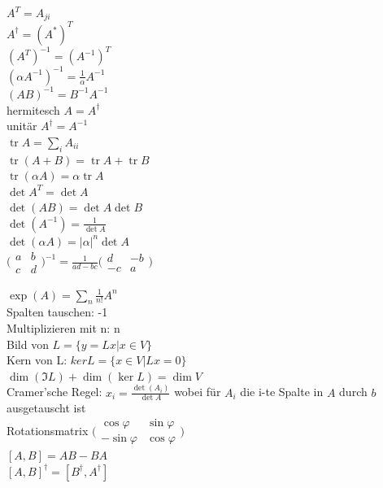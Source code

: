 \documentclass[12pt,a4paper, twoside]{article}
\DeclareMathOperator{\tr}{tr}
\newcommand{\abs}[1]{\left| #1 \right|}
\renewcommand{\=}[1]{\stackrel{#1}{=}}
\theoremstyle{definition}
\theoremstyle{remark}
\begin{document}
\begin{center}
\begin{minipage}[t]{.49\linewidth}
\vspace{0pt}
$A^T = A_{ji}$\\
$A^{\dagger} = (A^*)^T$\\
$(A^T)^{-1} = (A^{-1})^T$\\
$(\alpha A^{-1})^{-1} = \frac{1}{\alpha} A^{-1}$\\
$(AB)^{-1} = B^{-1} A^{-1}$\\
hermitesch $A = A^{\dagger}$\\
unitär $A^{\dagger} = A^{-1}$\\
$\tr A = \sum_i A_{ii}$\\
$\tr (A+B) = \tr A + \tr B$\\
$\tr (\alpha A) = \alpha \tr A$\\
$\det A^T = \det A$\\
$\det (AB) = \det A \det B$\\
$\det (A^{-1}) = \frac{1}{\det A}$\\
$\det (\alpha A) = \abs{\alpha}^n \det A$\\
$\bigl(\begin{smallmatrix} a & b\\
c & d \end{smallmatrix}\bigr)^{-1} = \frac{1}{ad-bc} \bigl(\begin{smallmatrix} d & -b\\
-c & a \end{smallmatrix}\bigr)$\\


\end{minipage}%
\begin{minipage}[t]{.49\linewidth}
\vspace{0pt}

$\exp (A) = \sum_n \frac{1}{n!} A^n$\\
Spalten tauschen: -1\\
Multiplizieren mit n: n\\
Bild von $L = \{y = Lx | x \in V\}$\\
Kern von L: $ker L = \{x \in V | L x = 0\}$\\
$\dim(\Im L) + \dim(\ker L) = \dim V$\\
Cramer'sche Regel: $x_i = \frac{\det (A_i)}{\det A}$ wobei für $A_i$ die i-te Spalte in $A$ durch $b$ ausgetauscht ist\\
Rotationsmatrix $\bigl(\begin{smallmatrix} \cos \varphi & \sin \varphi\\
-\sin \varphi & \cos \varphi \end{smallmatrix}\bigr)$\\
$[A, B] = AB-BA$\\
$[A,B]^{\dagger} = [B^{\dagger}, A^{\dagger}]$\\
\end{minipage}
\end{center}
\end{document}
